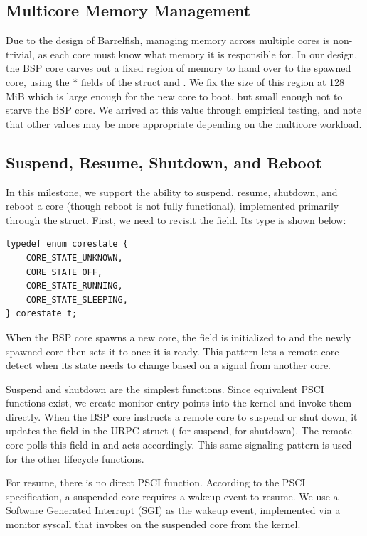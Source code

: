 \subsection{Multicore Memory Management}
Due to the design of Barrelfish, managing memory across multiple cores is non-trivial, as each
core must know what memory it is responsible for. In our design, the BSP core carves out a fixed
region of memory to hand over to the spawned core, using the * fields of the
 struct and . We fix the size of this region at 128 MiB which is large
enough for the new core to boot, but small enough not to starve the BSP core. We arrived at this
value through empirical testing, and note that other values may be more appropriate depending on
the multicore workload.

\subsection{Suspend, Resume, Shutdown, and Reboot}
In this milestone, we support the ability to suspend, resume, shutdown, and reboot a core (though
reboot is not fully functional), implemented primarily through the  struct.
First, we need to revisit the  field. Its type is shown below:
\begin{lstlisting}
typedef enum corestate {
    CORE_STATE_UNKNOWN,
    CORE_STATE_OFF,
    CORE_STATE_RUNNING,
    CORE_STATE_SLEEPING,
} corestate_t;
\end{lstlisting}
When the BSP core spawns a new core, the field is initialized to  and
the newly spawned core then sets it to  once it is ready. This pattern
lets a remote core detect when its state needs to change based on a signal from another core.

\medskip\noindent
Suspend and shutdown are the simplest functions. Since equivalent PSCI functions exist, we create
monitor entry points into the kernel and invoke them directly. When the BSP core instructs a remote
core to suspend or shut down, it updates the  field in the URPC struct
( for suspend,  for shutdown). The remote core polls
this field in  and acts accordingly. This same signaling pattern is used for the
other lifecycle functions.

\medskip\noindent
For resume, there is no direct PSCI function. According to the PSCI specification, a suspended
core requires a wakeup event to resume. We use a Software Generated Interrupt (SGI) as the wakeup
event, implemented via a monitor syscall that invokes  on the suspended core
from the kernel.

